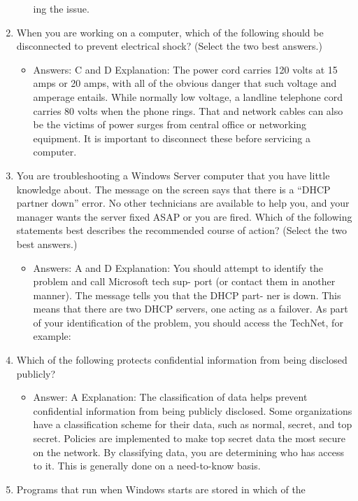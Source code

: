 \documentclass{article}
\begin{document}
\begin{enumerate}
\begin{itemize}
ing the issue.
    \end{itemize}
    \item When you are working on a computer, which of the following
should be disconnected to prevent electrical shock? (Select the
two best answers.)
    \begin{itemize}
        \item  Answers: C and D
Explanation: The power cord carries 120 volts at 15 amps or 20 amps, with all of the
obvious danger that such voltage and amperage entails. While normally low voltage, a
landline telephone cord carries 80 volts when the phone rings. That and network cables
can also be the victims of power surges from central office or networking equipment. It
is important to disconnect these before servicing a computer.
    \end{itemize}
    \item You are troubleshooting a Windows Server computer that you have
little knowledge about. The message on the screen says that there
is a “DHCP partner down” error. No other technicians are available
to help you, and your manager wants the server fixed ASAP or you
are fired. Which of the following statements best describes the
recommended course of action? (Select the two best answers.)
    \begin{itemize}
        \item Answers: A and D
Explanation: You should attempt to identify the problem and call Microsoft tech sup-
port (or contact them in another manner). The message tells you that the DHCP part-
ner is down. This means that there are two DHCP servers, one acting as a failover. As
part of your identification of the problem, you should access the TechNet, for example:
    \end{itemize}
    \item Which of the following protects confidential information from
being disclosed publicly?
    \begin{itemize}
        \item Answer: A
Explanation: The classification of data helps prevent confidential information from
being publicly disclosed. Some organizations have a classification scheme for their
data, such as normal, secret, and top secret. Policies are implemented to make top
secret data the most secure on the network. By classifying data, you are determining
who has access to it. This is generally done on a need-to-know basis.
    \end{itemize}
    \item Programs that run when Windows starts are stored in which of the

\end{enumerate}
\end{document}
